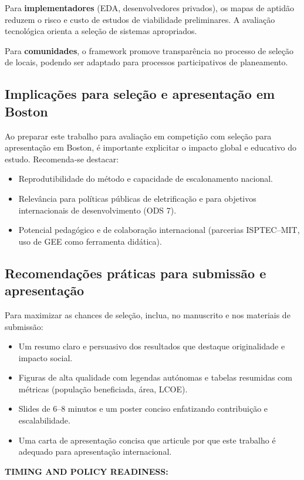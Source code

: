 \documentclass[12pt, a4paper]{article}
\begin{document}
\begin{itemize}
Para \textbf{implementadores} (EDA, desenvolvedores privados), os mapas de aptidão reduzem o risco e custo de estudos de viabilidade preliminares. A avaliação tecnológica orienta a seleção de sistemas apropriados.

Para \textbf{comunidades}, o framework promove transparência no processo de seleção de locais, podendo ser adaptado para processos participativos de planeamento.

\subsection{Implicações para seleção e apresentação em Boston}
Ao preparar este trabalho para avaliação em competição com seleção para apresentação em Boston, é importante explicitar o impacto global e educativo do estudo. Recomenda‑se destacar:
\begin{itemize}
    \item Reprodutibilidade do método e capacidade de escalonamento nacional.
    \item Relevância para políticas públicas de eletrificação e para objetivos internacionais de desenvolvimento (ODS 7).
    \item Potencial pedagógico e de colaboração internacional (parcerias ISPTEC–MIT, uso de GEE como ferramenta didática).
\end{itemize}

\subsection{Recomendações práticas para submissão e apresentação}
Para maximizar as chances de seleção, inclua, no manuscrito e nos materiais de submissão:
\begin{itemize}
    \item Um resumo claro e persuasivo dos resultados que destaque originalidade e impacto social.
    \item Figuras de alta qualidade com legendas autónomas e tabelas resumidas com métricas (população beneficiada, área, LCOE).
    \item Slides de 6–8 minutos e um poster conciso enfatizando contribuição e escalabilidade.
    \item Uma carta de apresentação concisa que articule por que este trabalho é adequado para apresentação internacional.
\end{itemize}

\noindent\textbf{TIMING AND POLICY READINESS:}


\end{itemize}
\end{document}
